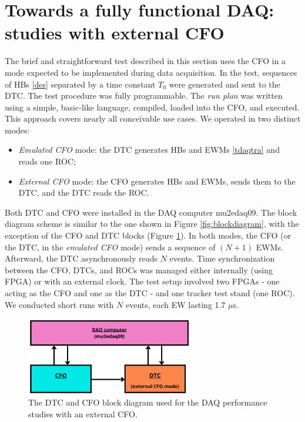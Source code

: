 \section{Towards a fully functional DAQ: studies with external CFO}
The brief and straightforward test described in 
this section uses the CFO in a mode expected to be 
implemented during data acquisition. 
In the test, sequences of HBs \ref{des} separated 
by a time constant  
\( T_0 \) were generated and sent to the DTC. The 
test procedure was fully programmable. 
The \textit{run plan} was written using a simple, 
basic-like language, 
compiled, loaded into the CFO, and executed. This 
approach covers nearly 
all conceivable use cases. We operated in two distinct modes:
\begin{itemize}
  \item \textit{Emulated CFO} mode: the DTC generates HBs and 
  EWMs \ref{tdaqtra} and reads one ROC;
  \item \textit{External CFO} mode: the CFO generates HBs and 
  EWMs, sends them to the DTC, and the DTC reads the ROC.
\end{itemize}
Both DTC and CFO were installed in the DAQ computer mu2edaq09. 
The block diagram scheme is similar to the one 
shown in Figure \ref{fig:blockdiagram}, 
with the exception of the CFO and DTC blocks 
(Figure \ref{fig:secondtest}).
In both modes, the CFO (or the DTC, in the 
\textit{emulated CFO} mode) 
sends a sequence of \( (N+1) \) EWMs. Afterward, the DTC 
asynchronously reads \( N \) events. 
Time synchronization between the CFO, DTCs, and 
ROCs was managed either 
internally (using FPGA) or with an external clock. 
The test setup involved two FPGAs - one acting as the CFO and 
one as the DTC - and one tracker test stand (one ROC). 
We conducted short runs with \( N \) events, 
each EW lasting  1.7 $\mu$s. 

\begin{figure}[!h]
  \centering
  \includegraphics[width=0.65\textwidth]{figures/png/Screenshot_20240714_131546.png}
  \caption[The DTC and CFO block diagram with an external CFO.]{The DTC and CFO block diagram 
  used for the DAQ performance studies with an external CFO.}
  \label{fig:secondtest}
\end{figure}



